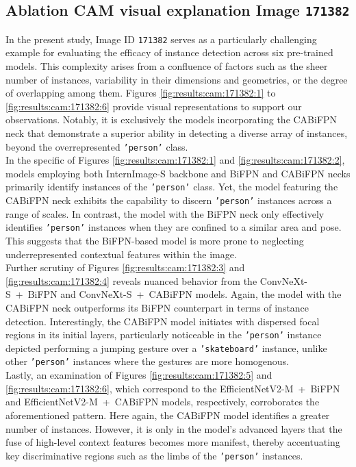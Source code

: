 \subsection{Ablation CAM visual explanation Image \texttt{171382}}\label{subsec:40:cam:171382}
In the present study, Image ID \texttt{171382} serves as a particularly challenging example for evaluating the efficacy of instance detection across six pre-trained models. This complexity arises from a confluence of factors such as the sheer number of instances, variability in their dimensions and geometries, or the degree of overlapping among them.
Figures \ref{fig:results:cam:171382:1} to \ref{fig:results:cam:171382:6} provide visual representations to support our observations. Notably, it is exclusively the models incorporating the CABiFPN neck that demonstrate a superior ability in detecting a diverse array of instances, beyond the overrepresented \texttt{'person'} class.\\

In the specific of Figures \ref{fig:results:cam:171382:1} and \ref{fig:results:cam:171382:2}, models employing both InternImage-S backbone and BiFPN and CABiFPN necks primarily identify instances of the \texttt{'person'} class. Yet, the model featuring the CABiFPN neck exhibits the capability to discern \texttt{'person'} instances across a range of scales. In contrast, the model with the BiFPN neck only effectively identifies \texttt{'person'} instances when they are confined to a similar area and pose. This suggests that the BiFPN-based model is more prone to neglecting underrepresented contextual features within the image.\\

Further scrutiny of Figures \ref{fig:results:cam:171382:3} and \ref{fig:results:cam:171382:4} reveals nuanced behavior from the ConvNeXt-S~+~BiFPN and ConvNeXt-S~+~CABiFPN models. Again, the model with the CABiFPN neck outperforms its BiFPN counterpart in terms of instance detection. Interestingly, the CABiFPN model initiates with dispersed focal regions in its initial layers, particularly noticeable in the \texttt{'person'} instance depicted performing a jumping gesture over a \texttt{'skateboard'} instance, unlike other \texttt{'person'} instances where the gestures are more homogenous.\\

Lastly, an examination of Figures \ref{fig:results:cam:171382:5} and \ref{fig:results:cam:171382:6}, which correspond to the EfficientNetV2-M~+~BiFPN and EfficientNetV2-M~+~CABiFPN models, respectively, corroborates the aforementioned pattern. Here again, the CABiFPN model identifies a greater number of instances. However, it is only in the model's advanced layers that the fuse of high-level context features becomes more manifest, thereby accentuating key discriminative regions such as the limbs of the \texttt{'person'} instances.

